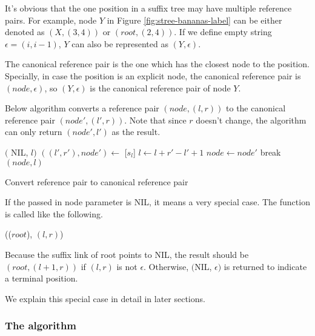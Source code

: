 \documentclass[UTF8]{article}
\begin{document}
It's obvious that the one position in a suffix tree may have multiple reference pairs.
For example, node $Y$ in Figure \ref{fig:stree-bananas-label} can be either
denoted as $(X, (3, 4))$ or $(root, (2, 4))$. If we define empty string
$\epsilon=(i, i-1)$, $Y$ can also be represented as $(Y, \epsilon)$.

The canonical reference pair is the one which has the closest node
to the position. Specially, in case the position is an
explicit node, the canonical reference pair is $(node, \epsilon)$, so $(Y, \epsilon)$
is the canonical reference pair of node $Y$.

Below algorithm converts a reference pair $(node, (l, r))$
to the canonical reference pair $(node', (l', r))$.
Note that since $r$ doesn't change, the algorithm can only return
$(node', l')$ as the result.

\begin{algorithm}
\begin{algorithmic}[1]
      \State \Return $($ NIL, $l)$
    \Else
      \State \Return {}
    \EndIf
  \EndIf
   
    \State $((l', r'), node') \gets$ [$s_l$]
      \State $l \gets l + r' - l' + 1$ 
      \State $node \gets node'$
    \Else
      \State break
    \EndIf
  \EndWhile
  \State \Return $(node, l)$
\EndFunction
\end{algorithmic}
\caption{Convert reference pair to canonical reference pair}
\label{algo:canon}
\end{algorithm}

If the passed in node parameter is NIL, it means a very special case.
The function is called like the following.

(($root$), $(l, r)$)

Because the suffix link of root points to NIL, the result should be
$(root, (l+1, r))$ if $(l, r)$ is not $\epsilon$. Otherwise,
$($NIL, $\epsilon)$ is returned to indicate a terminal position.

We explain this special case in detail in later sections.

\subsubsection{The algorithm}
\end{document}
